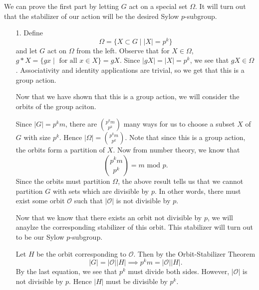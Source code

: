 \documentclass[12pt,letterpaper]{algebra_book}
\theoremstyle{definition}
\begin{document}
    \begin{prf}
        \textcolor{NavyBlue}{We can prove the first part by letting
        $G$ act on a special set $\Omega$. It will turn out that the
        stabilizer of our action will be the desired Sylow
        $p$-subgroup.}
        
        \begin{itemize}
            \item[1.] Define 
            \[
                \Omega = \{ X \subset G \mid |X| = p^k\}
            \] 
            and let $G$ act on $\Omega$ from the
            left. Observe that for $X \in \Omega$, $g * X = \{gx \mid
            \text{ for all } x \in X\} = gX.$ Since $|gX| = |X| = p^k$, we
            see that $gX \in \Omega$. Associativity and identity
            applications are trivial, so we get that this is a group
            action.
            
            \textcolor{NavyBlue}{Now that we have shown that this is a
            group action, we will consider the orbits of the group
            aciton.}
            
            Since $|G| = p^km$, there are $\displaystyle
            \binom{p^km}{p^k}$ many ways for us to choose a subset $X$
            of $G$ with size $p^k$. Hence $|\Omega| = \displaystyle
            \binom{p^km}{p^k}$. Note that since this is a group action, the
            orbits form a partition of $X$. Now from number theory, we
            know that 
            \[
                \binom{p^km}{p^k} = m \mbox{ mod } p.
            \]
            Since the orbits must partition $\Omega$, the above result
            tells us that we cannot partition $G$ with sets which are
            divisible by $p$. In other words, there must exist some
            orbit $\mathcal{O}$
            such that $|\mathcal{O}|$ is not divisible by $p$. 

            \textcolor{NavyBlue}{Now that we know that there exists an
            orbit not divisible by $p$, we will anaylze the
            corresponding stabilizer of this orbit. This stabilizer
            will turn out to be our Sylow $p$-subgroup. }

            Let $H$ be the orbit corresponding to $\mathcal{O}$. Then
            by the Orbit-Stabilizer Theorem 
            \[
                |G| = |\mathcal{O}||H| \implies p^km = |\mathcal{O}||H|.                
            \]
            By the last equation, we see that $p^k$ must divide both
            sides. However, $|\mathcal{O}|$ is not divisible by $p$.
            Hence $|H|$ must be divisible by $p^k$.
            

\end{itemize}
\end{prf}
\end{document}
